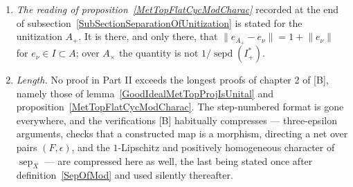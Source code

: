 \documentclass[11pt]{article}
\theoremstyle{plain}
\theoremstyle{definition}
\DeclareMathOperator{\sep}{sep}
\DeclareMathOperator{\sepd}{sepd}
\begin{document}
\begin{enumerate}[label = (\alph*)]
\item \emph{The reading of proposition~\ref{MetTopFlatCycModCharac}} recorded at
the end of subsection~\ref{SubSectionSeparationOfUnitization} is stated for the
unitization $A_+$. It is there, and only there, that
$\lVert e_{A_+}-e_\nu\rVert=1+\lVert e_\nu\rVert$ for $e_\nu\in I\subset A$; over
$A_\times$ the quantity is not $1/\sepd(I_+^*)$.

\item \emph{Length.} No proof in Part II exceeds the longest proofs of chapter 2
of [B], namely those of lemma~\ref{GoodIdealMetTopProjIsUnital} and
proposition~\ref{MetTopFlatCycModCharac}. The step-numbered format is gone
everywhere, and the verifications [B] habitually compresses --- three-epsilon
arguments, checks that a constructed map is a morphism, directing a net over
pairs $(F,\epsilon)$, and the $1$-Lipschitz and positively homogeneous character
of $\sep_X$ --- are compressed here as well, the last being stated once after
definition~\ref{SepOfMod} and used silently thereafter.
\end{enumerate}
\end{document}
